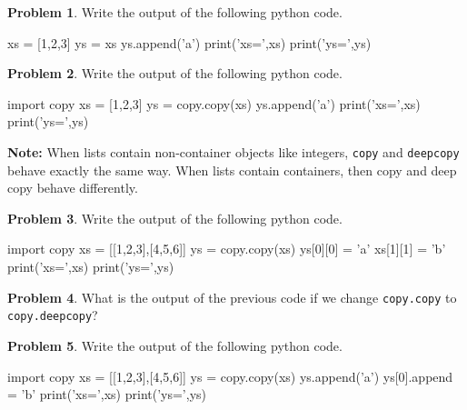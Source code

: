 \documentclass[12pt]{article}
\theoremstyle{definition}
\newtheorem{problem}{Problem}
\begin{document}
\begin{problem}
Write the output of the following python code.
\begin{python}
xs = [1,2,3]
ys = xs
ys.append('a')
print('xs=',xs)
print('ys=',ys)
\end{python}
\end{problem}
\vspace{2in}

\begin{problem}
Write the output of the following python code.
\begin{python}
import copy
xs = [1,2,3]
ys = copy.copy(xs)
ys.append('a')
print('xs=',xs)
print('ys=',ys)
\end{python}
\end{problem}
\vspace{2in}

\newpage
\noindent
\textbf{Note:}
When lists contain non-container objects like integers, \texttt{copy} and \texttt{deepcopy} behave exactly the same way.
When lists contain containers, then copy and deep copy behave differently.

\begin{problem}
Write the output of the following python code.
\begin{python}
import copy
xs = [[1,2,3],[4,5,6]]
ys = copy.copy(xs)
ys[0][0] = 'a'
xs[1][1] = 'b'
print('xs=',xs)
print('ys=',ys)
\end{python}
\end{problem}
\vspace{2in}

\begin{problem}
What is the output of the previous code if we change \texttt{copy.copy} to \texttt{copy.deepcopy}?
\end{problem}
\vspace{2in}

\newpage
\begin{problem}
Write the output of the following python code.
\begin{python}
import copy
xs = [[1,2,3],[4,5,6]]
ys = copy.copy(xs)
ys.append('a')
ys[0].append = 'b'
print('xs=',xs)
print('ys=',ys)
\end{python}
\end{problem}
\vspace{2in}
\end{document}
